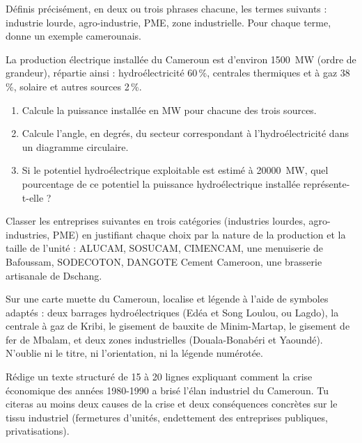 \documentclass[11pt]{article}
\newcommand{\cle}[1]{{\popxbold\color{popdark}#1}}
\newcounter{popsec}
\newcounter{popsub}
\newcommand{\courssub}[1]{%
  \stepcounter{popsub}%
  \par\vspace{9pt}\noindent{\popxbold\fontsize{11.5}{13}\selectfont\color{popink}{\color{poporange}\thepopsec.\thepopsub}\hspace{6pt}#1}\par\nopagebreak\vspace{4pt}
}
\begin{document}
\begin{exercice}[Définitions]
Définis précisément, en deux ou trois phrases chacune, les termes suivants : \cle{industrie lourde}, \cle{agro-industrie}, \cle{PME}, \cle{zone industrielle}. Pour chaque terme, donne un exemple camerounais.
\end{exercice}

\begin{exercice}
La production électrique installée du Cameroun est d'environ \SI{1500}{MW} (ordre de grandeur), répartie ainsi : hydroélectricité 60\,\%, centrales thermiques et à gaz 38\,\%, solaire et autres sources 2\,\%.
\begin{enumerate}
\item Calcule la puissance installée en MW pour chacune des trois sources.
\item Calcule l'angle, en degrés, du secteur correspondant à l'hydroélectricité dans un diagramme circulaire.
\item Si le potentiel hydroélectrique exploitable est estimé à \SI{20000}{MW}, quel pourcentage de ce potentiel la puissance hydroélectrique installée représente-t-elle ?
\end{enumerate}
\end{exercice}

\courssub{Je m'entraîne}

\begin{exercice}
Classer les entreprises suivantes en trois catégories (industries lourdes, agro-industries, PME) en justifiant chaque choix par la nature de la production et la taille de l'unité : ALUCAM, SOSUCAM, CIMENCAM, une menuiserie de Bafoussam, SODECOTON, DANGOTE Cement Cameroon, une brasserie artisanale de Dschang.
\end{exercice}

\begin{exercice}
Sur une carte muette du Cameroun, localise et légende à l'aide de symboles adaptés : deux barrages hydroélectriques (Edéa et Song Loulou, ou Lagdo), la centrale à gaz de Kribi, le gisement de bauxite de Minim-Martap, le gisement de fer de Mbalam, et deux zones industrielles (Douala-Bonabéri et Yaoundé). N'oublie ni le titre, ni l'orientation, ni la légende numérotée.
\end{exercice}

\begin{exercice}
Rédige un texte structuré de 15 à 20 lignes expliquant comment la crise économique des années 1980-1990 a brisé l'élan industriel du Cameroun. Tu citeras au moins deux causes de la crise et deux conséquences concrètes sur le tissu industriel (fermetures d'unités, endettement des entreprises publiques, privatisations).
\end{exercice}
\end{document}
